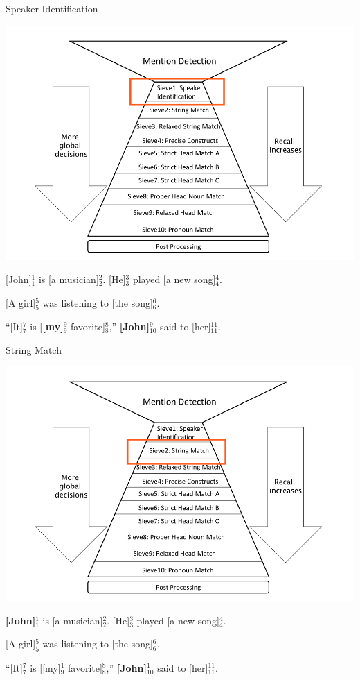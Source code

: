 \documentclass[11pt,a4paper]{beamer}
\begin{document}
\begin{frame}{Speaker Identification}

\includegraphics[scale=0.15]{sieve1.png} 
\bigskip

[John]$^{1}_{1}$ is [a musician]$^{2}_{2}$. [He]$^{3}_{3}$ played [a new song]$^{4}_{4}$.

[A girl]$^{5}_{5}$ was listening to [the song]$^{6}_{6}$.

“[It]$^{7}_{7}$ is [\textbf{[my]}$^{9}_{9}$ favorite]$^{8}_{8}$,” \textbf{[John]$^{9}_{10}$} said to [her]$^{11}_{11}$.

\end{frame}

\begin{frame}{String Match}

\includegraphics[scale=0.15]{sieve2.png} 
\bigskip

\textbf{[John]$^{1}_{1}$} is [a musician]$^{2}_{2}$. [He]$^{3}_{3}$ played [a new song]$^{4}_{4}$.

[A girl]$^{5}_{5}$ was listening to [the song]$^{6}_{6}$.

“[It]$^{7}_{7}$ is [[my]$^{1}_{9}$ favorite]$^{8}_{8}$,” \textbf{[John]$^{1}_{10}$} said to [her]$^{11}_{11}$.

\end{frame}
\end{document}
